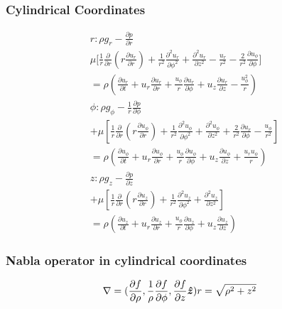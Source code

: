 \documentclass[a4paper]{amsart}
\begin{document}
\subsubsection{Cylindrical Coordinates}
\begin{eqnarray*}
	r:
	\rho g_r
	-\frac{\partial p}{\partial r}
	\\
	\mu \Bigg[\frac{1}{r}\frac{\partial}{\partial r}\left(r \frac{\partial u_r}{\partial r}\right) 
+ \frac{1}{r^2}\frac{\partial^2 u_r}{\partial \phi^2}
	+ \frac{\partial^2 u_r}{\partial z^2}-\frac{u_r}{r^2}-\frac{2}{r^2}\frac{\partial u_\phi}{\partial \phi}\Bigg]
	\\=
	\rho\left(
	\frac{\partial u_r}{\partial t} + u_r \frac{\partial u_r}{\partial r} + \frac{u_{\phi}}{r} \frac{\partial u_r}{\partial \phi} 
	+ u_z \frac{\partial u_r}{\partial z} - \frac{u_{\phi}^2}{r}
	\right) 
	\\
	\phi: 
	\rho g_{\phi}
	-\frac{1}{r}\frac{\partial p}{\partial \phi} 
	\\
	+ \mu 
		\left[\frac{1}{r}\frac{\partial}{\partial r}\left(r \frac{\partial u_{\phi}}{\partial r}\right) 
		+ \frac{1}{r^2}\frac{\partial^2 u_{\phi}}{\partial \phi^2} 
		+ \frac{\partial^2 u_{\phi}}{\partial z^2} 
		+ \frac{2}{r^2}\frac{\partial u_r}{\partial \phi} 
		- \frac{u_{\phi}}{r^2}\right]
	\\
	=
	\rho\left(	
		\frac{\partial u_{\phi}}{\partial t} 
		+ u_r \frac{\partial u_{\phi}}{\partial r} 
		+ \frac{u_{\phi}}{r} \frac{\partial u_{\phi}}{\partial \phi} 
		+ u_z \frac{\partial u_{\phi}}{\partial z} 
		+ \frac{u_r u_{\phi}}{r}\right) 	
	\\
	z:
	\rho g_z
	-\frac{\partial p}{\partial z}
	\\
	+ \mu \left[\frac{1}{r}\frac{\partial}{\partial r}\left(r \frac{\partial u_z}{\partial r}\right) + \frac{1}{r^2}\frac{\partial^2 u_z}{\partial \phi^2} + \frac{\partial^2 u_z}{\partial z^2}\right]
	\\=
	\rho 
	\left(\frac{\partial u_z}{\partial t} 
	+ u_r \frac{\partial u_z}{\partial r} 
	+ \frac{u_{\phi}}{r} \frac{\partial u_z}{\partial \phi} 
	+ u_z \frac{\partial u_z}{\partial z}\right) 
\end{eqnarray*}



\subsubsection{Nabla operator in cylindrical coordinates}
\begin{eqnarray*}
	\nabla=(
	{\partial f \over \partial \rho},
	{1 \over \rho}{\partial f \over \partial \phi},
	{\partial f \over \partial z}\boldsymbol{\hat z})
	&
	r=\sqrt{\rho^2+z^2}
\end{eqnarray*}
\end{document}
